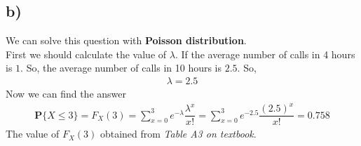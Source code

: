 \documentclass[12pt]{article}
\begin{document}
\subsection*{b)}
We can solve this question with \textbf{Poisson distribution}.\\
First we should calculate the value of $\lambda$.
If the average number of calls in 4 hours is $1$. So, the average number of calls in 10 hours is $2.5$. So, 
\begin{equation}
    \begin{split}
        \lambda = 2.5   
    \end{split}
\end{equation}
Now we can find the answer
\begin{equation}
    \begin{split}
        \textbf{P}\{X \leq 3 \} = F_{X}(3) = \sum_{x = 0}^{3} e^{- \lambda} \dfrac{\lambda^x}{x!} = \sum_{x = 0}^{3} e^{- 2.5} \dfrac{\left(2.5\right)^x}{x!} = 0.758
    \end{split}
\end{equation}
The value of $F_X(3)$ obtained from \textit{Table A3 on textbook}.
\end{document}
